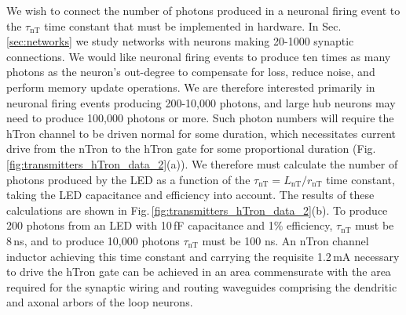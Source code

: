 \documentclass[aip,amsmath,amssymb,reprint,nofootinbib]{revtex4-1}
\begin{document}
We wish to connect the number of photons produced in a neuronal firing event to the $\tau_{\mathrm{nT}}$ time constant that must be implemented in hardware. In Sec.\,\ref{sec:networks} we study networks with neurons making 20-1000 synaptic connections. We would like neuronal firing events to produce ten times as many photons as the neuron's out-degree to compensate for loss, reduce noise, and perform memory update operations. We are therefore interested primarily in neuronal firing events producing 200-10,000 photons, and large hub neurons may need to produce 100,000 photons or more. Such photon numbers will require the hTron channel to be driven normal for some duration, which necessitates current drive from the nTron to the hTron gate for some proportional duration (Fig.\,\ref{fig:transmitters_hTron_data_2}(a)). We therefore must calculate the number of photons produced by the LED as a function of the $\tau_{\mathrm{nT}} = L_{\mathrm{nT}}/r_{\mathrm{nT}}$ time constant, taking the LED capacitance and efficiency into account. The results of these calculations are shown in Fig.\,\ref{fig:transmitters_hTron_data_2}(b). To produce 200 photons from an LED with 10\,fF capacitance and 1\% efficiency, $\tau_{\mathrm{nT}}$ must be 8\,ns, and to produce 10,000 photons $\tau_{\mathrm{nT}}$ must be 100 ns. An nTron channel inductor achieving this time constant and carrying the requisite 1.2\,mA necessary to drive the hTron gate can be achieved in an area commensurate with the area required for the synaptic wiring and routing waveguides comprising the dendritic and axonal arbors of the loop neurons. 
\end{document}
